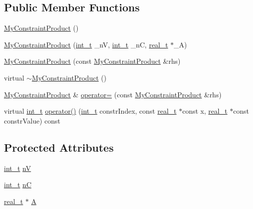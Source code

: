 \subsection*{Public Member Functions}
\begin{DoxyCompactItemize}
\item 
\hyperlink{class_my_constraint_product_a670ac34e0d2147f7be90334c51c280b1}{My\+Constraint\+Product} ()
\item 
\hyperlink{class_my_constraint_product_aa59ae2fb906bae0074fdcf1b2b7e61c0}{My\+Constraint\+Product} (\hyperlink{_types_8hpp_ab6fd6105e64ed14a0c9281326f05e623}{int\+\_\+t} \+\_\+nV, \hyperlink{_types_8hpp_ab6fd6105e64ed14a0c9281326f05e623}{int\+\_\+t} \+\_\+nC, \hyperlink{qp_o_a_s_e_s__wrapper_8h_a0d00e2b3dfadee81331bbb39068570c4}{real\+\_\+t} $\ast$\+\_\+A)
\item 
\hyperlink{class_my_constraint_product_a8713cbd57754373bb7b882b18a6dda3b}{My\+Constraint\+Product} (const \hyperlink{class_my_constraint_product}{My\+Constraint\+Product} \&rhs)
\item 
virtual \hyperlink{class_my_constraint_product_a91575bc7f737462aef210acec28b322e}{$\sim$\+My\+Constraint\+Product} ()
\item 
\hyperlink{class_my_constraint_product}{My\+Constraint\+Product} \& \hyperlink{class_my_constraint_product_a782959ec14624f774582d954b8ab9a70}{operator=} (const \hyperlink{class_my_constraint_product}{My\+Constraint\+Product} \&rhs)
\item 
virtual \hyperlink{_types_8hpp_ab6fd6105e64ed14a0c9281326f05e623}{int\+\_\+t} \hyperlink{class_my_constraint_product_a6ba41714619bb87b76597503373c2c39}{operator()} (\hyperlink{_types_8hpp_ab6fd6105e64ed14a0c9281326f05e623}{int\+\_\+t} constr\+Index, const \hyperlink{qp_o_a_s_e_s__wrapper_8h_a0d00e2b3dfadee81331bbb39068570c4}{real\+\_\+t} $\ast$const x, \hyperlink{qp_o_a_s_e_s__wrapper_8h_a0d00e2b3dfadee81331bbb39068570c4}{real\+\_\+t} $\ast$const constr\+Value) const
\end{DoxyCompactItemize}
\subsection*{Protected Attributes}
\begin{DoxyCompactItemize}
\item 
\hyperlink{_types_8hpp_ab6fd6105e64ed14a0c9281326f05e623}{int\+\_\+t} \hyperlink{class_my_constraint_product_a65e340b03049602db9ba4bb29bf1149c}{nV}
\item 
\hyperlink{_types_8hpp_ab6fd6105e64ed14a0c9281326f05e623}{int\+\_\+t} \hyperlink{class_my_constraint_product_aeffd8f3e9124b6d0f0b4e2e9d5487f0a}{nC}
\item 
\hyperlink{qp_o_a_s_e_s__wrapper_8h_a0d00e2b3dfadee81331bbb39068570c4}{real\+\_\+t} $\ast$ \hyperlink{class_my_constraint_product_a654d468b76949a46fc92d3c0fae8b8f7}{A}
\end{DoxyCompactItemize}


